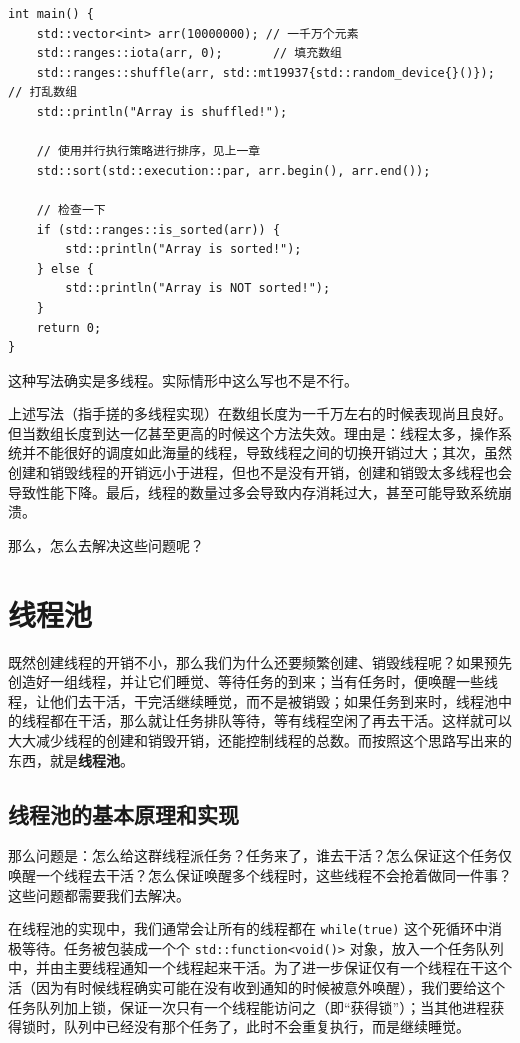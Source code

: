 \begin{example}{}{}
\begin{verbatim}
int main() {
    std::vector<int> arr(10000000); // 一千万个元素
    std::ranges::iota(arr, 0);       // 填充数组
    std::ranges::shuffle(arr, std::mt19937{std::random_device{}()}); // 打乱数组
    std::println("Array is shuffled!");

    // 使用并行执行策略进行排序，见上一章
    std::sort(std::execution::par, arr.begin(), arr.end());

    // 检查一下
    if (std::ranges::is_sorted(arr)) {
        std::println("Array is sorted!");
    } else {
        std::println("Array is NOT sorted!");
    }
    return 0;
}
\end{verbatim}
这种写法确实是多线程。实际情形中这么写也不是不行。

\end{example}

上述写法（指手搓的多线程实现）在数组长度为一千万左右的时候表现尚且良好。但当数组长度到达一亿甚至更高的时候这个方法失效。理由是：线程太多，操作系统并不能很好的调度如此海量的线程，导致线程之间的切换开销过大；其次，虽然创建和销毁线程的开销远小于进程，但也不是没有开销，创建和销毁太多线程也会导致性能下降。最后，线程的数量过多会导致内存消耗过大，甚至可能导致系统崩溃。

那么，怎么去解决这些问题呢？

\section{线程池}

既然创建线程的开销不小，那么我们为什么还要频繁创建、销毁线程呢？如果预先创造好一组线程，并让它们睡觉、等待任务的到来；当有任务时，便唤醒一些线程，让他们去干活，干完活继续睡觉，而不是被销毁；如果任务到来时，线程池中的线程都在干活，那么就让任务排队等待，等有线程空闲了再去干活。这样就可以大大减少线程的创建和销毁开销，还能控制线程的总数。而按照这个思路写出来的东西，就是\textbf{线程池}。

\subsection{线程池的基本原理和实现}

那么问题是：怎么给这群线程派任务？任务来了，谁去干活？怎么保证这个任务仅唤醒一个线程去干活？怎么保证唤醒多个线程时，这些线程不会抢着做同一件事？这些问题都需要我们去解决。

在线程池的实现中，我们通常会让所有的线程都在 \verb|while(true)| 这个死循环中消极等待。任务被包装成一个个 \verb|std::function<void()>| 对象，放入一个任务队列中，并由主要线程通知一个线程起来干活。为了进一步保证仅有一个线程在干这个活（因为有时候线程确实可能在没有收到通知的时候被意外唤醒），我们要给这个任务队列加上锁，保证一次只有一个线程能访问之（即“获得锁”）；当其他进程获得锁时，队列中已经没有那个任务了，此时不会重复执行，而是继续睡觉。


